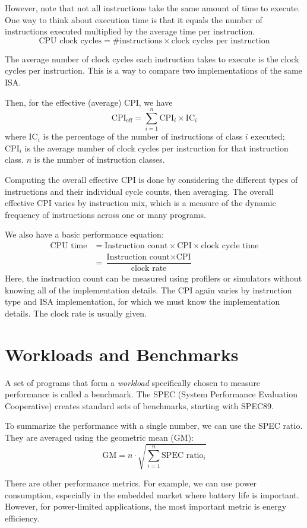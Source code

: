 However, note that not all instructions take the same amount of time to execute. One way to think about execution time is that it equals the number of instructions executed multiplied by the average time per instruction.
\[
  \text{CPU clock cycles} = \text{\# instructions} \times \text{clock cycles per instruction}
\]

The average number of clock cycles each instruction takes to execute is the clock cycles per instruction. This is a way to compare two implementations of the same ISA.

Then, for the effective (average) CPI, we have
\[
  \text{CPI}_{\text{eff}} = \sum_{i = 1}^n \text{CPI}_i \times \text{IC}_i
\]
where \(\text{IC}_i\) is the percentage of the number of instructions of class \(i\) executed; \(\text{CPI}_i\) is the average number of clock cycles per instruction for that instruction class. \(n\) is the number of instruction classes.

Computing the overall effective CPI is done by considering the different types of instructions and their individual cycle counts, then averaging. The overall effective CPI varies by instruction mix, which is a measure of the dynamic frequency of instructions across one or many programs.

We also have a basic performance equation:
\[
\begin{aligned}
  \text{CPU time} &= \text{Instruction count} \times \text{CPI} \times \text{clock cycle time} \\
  &= \dfrac{\text{Instruction count} \times \text{CPI}}{\text{clock rate}}
\end{aligned}
\]
Here, the instruction count can be measured using profilers or simulators without knowing all of the implementation details. The CPI again varies by instruction type and ISA implementation, for which we must know the implementation details. The clock rate is usually given.

\section{Workloads and Benchmarks}
A set of programs that form a \textit{workload} specifically chosen to measure performance is called a benchmark. The SPEC (System Performance Evaluation Cooperative) creates standard sets of benchmarks, starting with SPEC89.

To summarize the performance with a single number, we can use the SPEC ratio. They are averaged using the geometric mean (GM): 
\[
  \text{GM} = n \cdot \sqrt{\sum_{i = 1}^n \text{SPEC ratio}_i} 
\]

There are  other performance metrics. For example, we can use power consumption, especially in the embedded market where battery life is important. However, for power-limited applications, the most important metric is energy efficiency.
